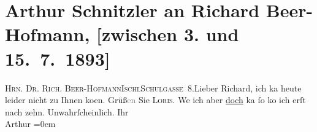 

         
         \renewcommand{\erwaehntePersonen}{Personen: Richard Beer-Hofmann, Hugo von Hofmannsthal}
         \renewcommand{\erwaehnteOrte}{Orte: Bad Ischl, Schulgasse}
         \renewcommand{\erwaehnteWerke}{}
               \section[Arthur Schnitzler an Richard Beer-Hofmann, {[}zwischen 3. und 15. 7. 1893{]}]{ Arthur Schnitzler an Richard Beer-Hofmann, {[}zwischen 3. und
               15. 7. 1893{]}}\nopagebreak{}\rehead{ }\begin{ledgroupsized}[t]{13cm}\normalsize\beginnumbering{} \toendnotes[C]{\smallbreak\pagebreak[2]} 
\pstart{}{\pb}\textsc{Hrn. Dr. Rich. Beer-Hofmann}\pend{}\pstart{}\textsc{Ischl}\pend{}\pstart{}\textsc{Schulgasse 8}.\pend{}{\bigskip}\pstart{}{\pb}Lieber Richard,\pend\pstart
           ich ka{\geminationn} heute leider nicht zu Ihnen {\pb}ko{\geminationm}en.\pend
           \pstart
           Grüß\textcolor{gray}{en} Sie \textsc{Loris}.\pend
           \pstart
           We{\geminationn} ich aber \uline{doch} ka{\geminationn}{ }ſo ko{\geminationm} ich erſt nach
               zehn.\pend
           \pstart
           Unwahrſcheinlich.\pend
           \pstart
           Ihr{\\[\baselineskip]}\spacefill\mbox{Arthur}\pend
           \leftskip=0em{}
         
         \endnumbering{}\end{ledgroupsized}  \newcommand{\dateiname}{L00231}\newcommand{\titel}{Arthur Schnitzler an Richard Beer-Hofmann, [zwischen 3. und 15. 7. 1893]}\newcommand{\editorInnen}{Martin Anton Müller und Gerd-Hermann Susen}
      